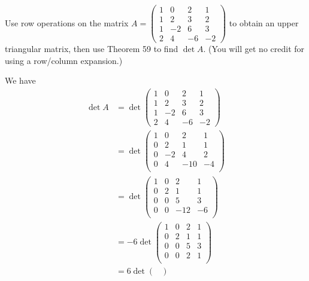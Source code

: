 \documentclass{eh-homework}
\begin{document}
\begin{question}{1}
    Use row operations on the matrix $A = \begin{pmatrix}
    1 & 0 & 2 & 1 \\
    1 & 2 & 3 & 2 \\
    1 & -2 & 6 & 3 \\
    2 & 4 & -6 & -2
    \end{pmatrix}$ to obtain an upper triangular matrix, then use Theorem 59 to find $\det A$. (You will get no credit for using a row/column expansion.)

    \bigskip

    We have
    \begin{align*}
        \det A &= \det \begin{pmatrix}
            1 & 0 & 2 & 1 \\
            1 & 2 & 3 & 2 \\
            1 & -2 & 6 & 3 \\
            2 & 4 & -6 & -2
            \end{pmatrix} \\
            &= \det \begin{pmatrix}
                1 & 0 & 2 &  1 \\
                0 & 2 & 1 &  1 \\
                0 & -2 & 4 &  2 \\
                0 & 4 & -10 &  -4 \\
            \end{pmatrix} \\
            &= \det \begin{pmatrix}
                1 & 0 & 2 &  1 \\
                0 & 2 & 1 &  1 \\
                0 & 0 & 5 &  3 \\
                0 & 0 & -12 &  -6 \\
            \end{pmatrix} \\
            &= -6\det \begin{pmatrix}
                1 & 0 & 2 &  1 \\
                0 & 2 & 1 &  1 \\
                0 & 0 & 5 &  3 \\
                0 & 0 & 2 &  1 \\
            \end{pmatrix} \\
            &= 6\det \begin{pmatrix}

\end{pmatrix}
\end{align*}
\end{question}
\end{document}
